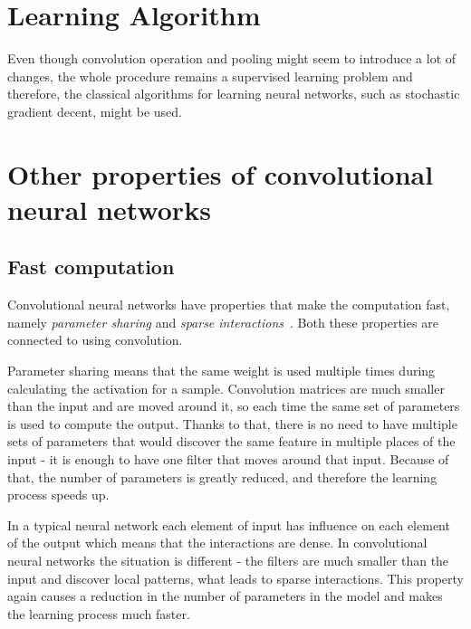 \documentclass[a4paper,10pt]{report}
\begin{document}
      
      \section{Learning Algorithm}
      Even though convolution operation and pooling might seem to introduce a lot of changes, the whole procedure remains a supervised learning problem and therefore, the classical algorithms for learning neural networks, such as stochastic gradient decent, might be used.
      
       \section{Other properties of convolutional neural networks}
      
	\subsection{Fast computation}
	  Convolutional neural networks have properties that make the computation fast, namely \emph{parameter sharing} and \emph{sparse interactions}~\cite{Bengio}. Both these properties are connected to using convolution. 
	  
	  Parameter sharing means that the same weight is used multiple times during calculating the activation for a sample.
	  Convolution matrices are much smaller than the input and are moved around it, so each time the same set of parameters is used to compute the output. Thanks to that, there is no need to have multiple sets of parameters that would discover the same feature in multiple places of the input - it is enough to have one filter that moves around that input. Because of that, the number of parameters is greatly reduced, and therefore the learning process speeds up. 
	  
	  In a typical neural network each element of input has influence on each element of the output which means that the interactions are dense. In convolutional neural networks the situation is different - the filters are much smaller than the input and discover local patterns, what leads to sparse interactions. This property again causes a reduction in the number of parameters in the model and makes the learning process much faster. 	
	  
\end{document}
